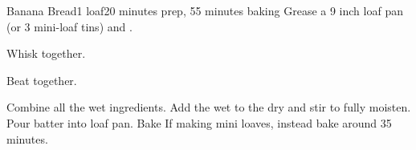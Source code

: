 \documentclass[../Cookbook.tex]{subfiles}
\begin{document}
\begin{recipe}{Banana Bread}{1 loaf}{20 minutes prep, 55 minutes baking}
	Grease a 9 inch loaf pan (or 3 mini-loaf tins) and .

	Whisk together.

	Beat together.

	Combine all the wet ingredients.
	Add the wet to the dry and stir to fully moisten.
	Pour batter into loaf pan.
	Bake 
	If making mini loaves, instead bake around 35 minutes.
\end{recipe}
\end{document}
